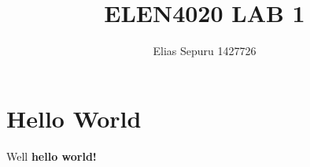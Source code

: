 \documentclass[12pt]{article}
\begin{document}
\title{ELEN4020 LAB 1}
\author{Elias Sepuru 1427726}

\maketitle

\section{Hello World}
Well \textbf{hello world!}
\end{document}
